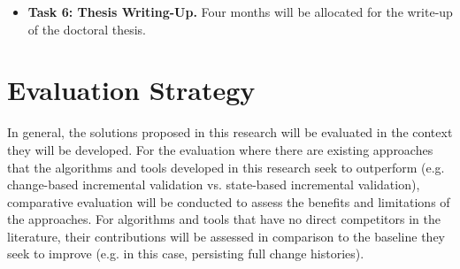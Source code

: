 \documentclass[12pt, a4paper]{report} \usepackage[titletoc]{appendix}
\begin{document}
\begin{itemize}
	\item \textbf{Task 6: Thesis Writing-Up.} Four months will be allocated for the write-up of the doctoral thesis.  
\end{itemize}

\chapter{Evaluation Strategy}
\label{ch:evaluation_strategy}
In general, the solutions proposed in this research will be evaluated in the context they will be developed. For the evaluation where there are existing approaches that the algorithms and tools developed in this research seek to outperform (e.g. change-based incremental validation vs. state-based incremental validation), comparative evaluation will be conducted to assess the benefits and limitations of the approaches. For algorithms and tools that have no direct competitors in the literature, their contributions will be assessed in comparison to the baseline they seek to improve (e.g. in this case, persisting full change histories).  
\end{document}
